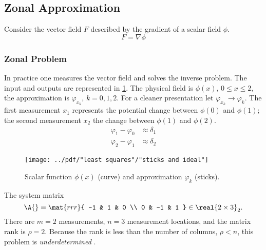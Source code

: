 \subsection{\label{ssec:zonal approx}Zonal Approximation}  %
Consider the vector field $F$ described by the gradient of a scalar field $\phi$.
  \begin{equation*}   %
    F = \nabla \phi
  \end{equation*}

\subsubsection{\label{ssec:zonal solution}Zonal Problem}  %
In practice one measures the vector field and solves the inverse problem. The input and outputs are represented in \ref{fig:sticks}. The physical field is $\phi(x)$, $0\le x \le 2$, the approximation is $\varphi_{x_{k}}$, $k=0,1,2$. For a cleaner presentation let $\varphi_{x_{k}} \rightarrow \varphi_{k}$. The first measurement $x_{1}$ represents the potential change between $\phi(0)$ and $\phi(1)$; the second measurement $x_{2}$ the change between $\phi(1)$ and $\phi(2)$.
  \begin{equation*}   %
    \begin{split}
      \varphi_{1} - \varphi_{0} &\approx \delta_{1} \\
      \varphi_{2} - \varphi_{1} &\approx \delta_{2}
    \end{split}
  \end{equation*}
\begin{figure}[htbp] %
   \centering
    \texttt{[image: ../pdf/"least squares"/"sticks and ideal"]} 
   \caption[Scalar function $\phi$ and approximations.]{Scalar function $\phi(x)$ (curve) and approximation $\varphi_{k}$ (sticks).}
   \label{fig:sticks}
\end{figure}

The system matrix 
  \begin{equation*}   %
      \A{} =     \mat{rrr}{ 
      -1 & 1 & 0 \\
       0 & -1 & 1 } \in \real{2 \times 3}_{2}.
  \end{equation*}
There are $m = 2$ measurements, $n = 3$ measurement locations, and the matrix rank is $\rho = 2$. Because the rank is less than the number of columns, $\rho < n$, this problem is \emph{underdetermined} .

